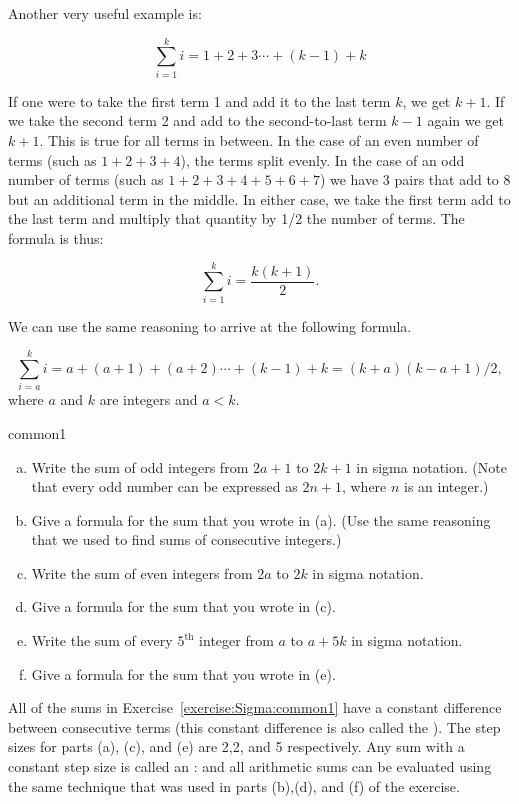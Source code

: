 Another very useful example is:

\[\sum_{i=1}^{k}i=1+2+3\cdots+(k-1) + k\]

If one were to take the first term 1 and add it to the last term $k$, we get $k+1$.  If we take the second term 2 and add to the second-to-last term $k-1$ again we get $k+1$.  This is true for all terms in between.  In the case of an even number of terms (such as $1+2+3+4$),  the terms split evenly.  In the case of an odd number of terms (such as $1+2+3+4+5+6+7$) we have 3 pairs that add to 8 but an additional term in the middle.  In either case, we take the first term add to the last term and multiply that quantity by 1/2 the number of terms.  The formula is thus:

\[\sum_{i=1}^{k}i= \frac{k(k+1)}{2}.\] 

We can use the same reasoning to arrive at the following formula.

\[\sum_{i=a}^{k}i=a+(a+1)+(a+2)\cdots+(k-1) + k = (k+a)(k-a+1)/2,\] 
where $a$ and $k$ are integers and $a<k$.


\begin{exercise}{common1}
\begin{enumerate}[(a)]
\item 
Write the sum of odd integers from $2a+1$ to $2k+1$ in sigma notation. (Note that every odd number can be expressed as $2n+1$, where $n$ is an integer.)
\item
Give a formula for the sum that you wrote in (a).  (Use the same reasoning that we used to find sums of consecutive integers.)
\item 
Write the sum of even integers from $2a$ to $2k$ in sigma notation.
\item
Give a formula for the sum that you wrote in (c). 
\item 
Write the sum of every $5^{\text{th}}$ integer from $a$ to $a + 5k$ in sigma notation.
\item
Give a formula for the sum that you wrote in (e). 
\end {enumerate}
\end {exercise}

All of the sums in Exercise~\ref{exercise:Sigma:common1} have a constant difference between consecutive terms (this constant difference is also called the ). The step sizes for parts (a), (c), and (e) are 2,2, and 5 respectively.  Any sum with a constant step size is called an : and all arithmetic sums can be evaluated using the same technique that was used  in parts (b),(d), and (f) of the exercise.  

